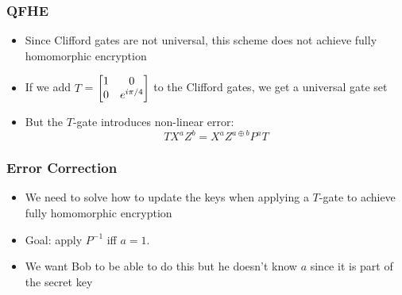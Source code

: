   \begin{frame}
 \frametitle{QFHE}
 \begin{itemize}
   \item Since Clifford gates are not universal, this scheme does not achieve fully homomorphic encryption
   \item If we add $T$ = $\begin{bmatrix} 1 & 0 \\ 0 & e^{\mathnormal{i} \pi / 4}  \end{bmatrix}$ to the Clifford gates, we get a universal gate set
   \item But the $T$-gate introduces non-linear error: \\ 
   \[  TX^aZ^b = X^aZ^{a \oplus b}P^aT  \]
 \end{itemize}
 \end{frame}
 
  \begin{frame}
 \frametitle{Error Correction}
 \begin{itemize}
    \item We need to solve how to update the keys when applying a $T$-gate to achieve fully homomorphic encryption
   \item Goal: apply $P^{-1}$ iff $a = 1$. 
   \item We want Bob to be able to do this but he doesn't know $a$ since it is part of the secret key
 \end{itemize}
 \end{frame}
 
 
